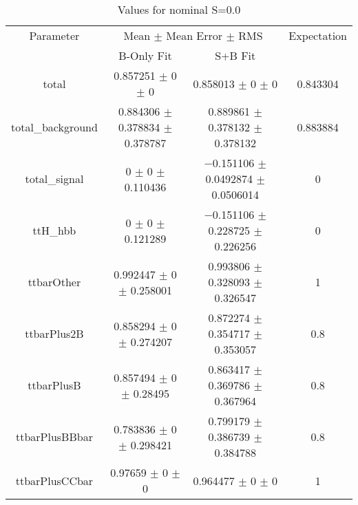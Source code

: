 \begin{table}
\centering
\caption{Values for nominal S=0.0}
\begin{tabular}{cccc}
\toprule
Parameter & \multicolumn{2}{c}{Mean $\pm$ Mean Error $\pm$ RMS} & Expectation\\
 & B-Only Fit & S+B Fit & \\
\midrule
total & \num{0.857251} $\pm$ \num{0} $\pm$ \num{0} & \num{0.858013} $\pm$ \num{0} $\pm$ \num{0} & \num{0.843304}\\
total\_background & \num{0.884306} $\pm$ \num{0.378834} $\pm$ \num{0.378787} & \num{0.889861} $\pm$ \num{0.378132} $\pm$ \num{0.378132} & \num{0.883884}\\
total\_signal & \num{0} $\pm$ \num{0} $\pm$ \num{0.110436} & \num{-0.151106} $\pm$ \num{0.0492874} $\pm$ \num{0.0506014} & \num{0}\\
ttH\_hbb & \num{0} $\pm$ \num{0} $\pm$ \num{0.121289} & \num{-0.151106} $\pm$ \num{0.228725} $\pm$ \num{0.226256} & \num{0}\\
ttbarOther & \num{0.992447} $\pm$ \num{0} $\pm$ \num{0.258001} & \num{0.993806} $\pm$ \num{0.328093} $\pm$ \num{0.326547} & \num{1}\\
ttbarPlus2B & \num{0.858294} $\pm$ \num{0} $\pm$ \num{0.274207} & \num{0.872274} $\pm$ \num{0.354717} $\pm$ \num{0.353057} & \num{0.8}\\
ttbarPlusB & \num{0.857494} $\pm$ \num{0} $\pm$ \num{0.28495} & \num{0.863417} $\pm$ \num{0.369786} $\pm$ \num{0.367964} & \num{0.8}\\
ttbarPlusBBbar & \num{0.783836} $\pm$ \num{0} $\pm$ \num{0.298421} & \num{0.799179} $\pm$ \num{0.386739} $\pm$ \num{0.384788} & \num{0.8}\\
ttbarPlusCCbar & \num{0.97659} $\pm$ \num{0} $\pm$ \num{0} & \num{0.964477} $\pm$ \num{0} $\pm$ \num{0} & \num{1}\\
\bottomrule
\end{tabular}
\end{table}